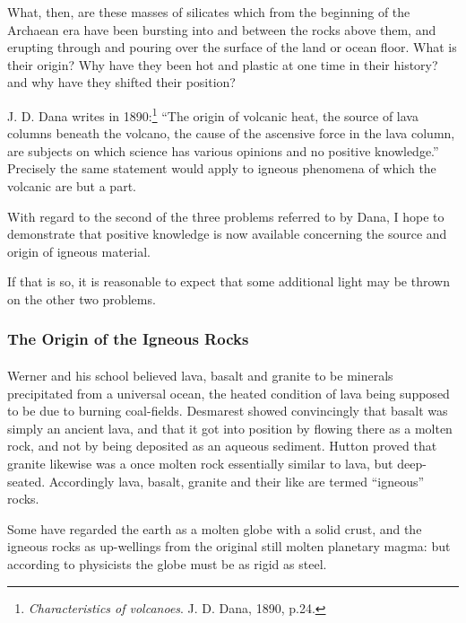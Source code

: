 \documentclass[a4paper, 12pt, oneside]{article}
\begin{document}
What, then, are these masses of silicates which from the beginning of the Archaean era have been bursting into and between the rocks above them, and erupting through and pouring over the surface of the land or ocean floor. What is their origin? Why have they been hot and plastic at one time in their history? and why have they shifted their position?

J. D. Dana writes in 1890:\footnote{\emph{Characteristics of volcanoes}. J. D. Dana, 1890, p.24.} ``The origin of volcanic heat, the source of lava columns beneath the volcano, the cause of the ascensive force in the lava column, are subjects on which science has various opinions and no positive knowledge.'' Precisely the same statement would apply to igneous phenomena of which the volcanic are but a part.

With regard to the second of the three problems referred to by Dana, I hope to demonstrate that positive knowledge is now available concerning the source and origin of igneous material.

If that is so, it is reasonable to expect that some additional light may be thrown on the other two problems.

\subsubsection{The Origin of the Igneous Rocks}
\paragraph{}
Werner and his school believed lava, basalt and granite to be minerals precipitated from a universal ocean, the heated condition of lava being supposed to be due to burning coal-fields. Desmarest showed convincingly that basalt was simply an ancient lava, and that it got into position by flowing there as a molten rock, and not by being deposited as an aqueous sediment. Hutton proved that granite likewise was a once molten rock essentially similar to lava, but deep-seated. Accordingly lava, basalt, granite and their like are termed ``igneous'' rocks.

Some have regarded the earth as a molten globe with a solid crust, and the igneous rocks as up-wellings from the original still molten planetary magma: but according to physicists the globe must be as rigid as steel.
\end{document}
